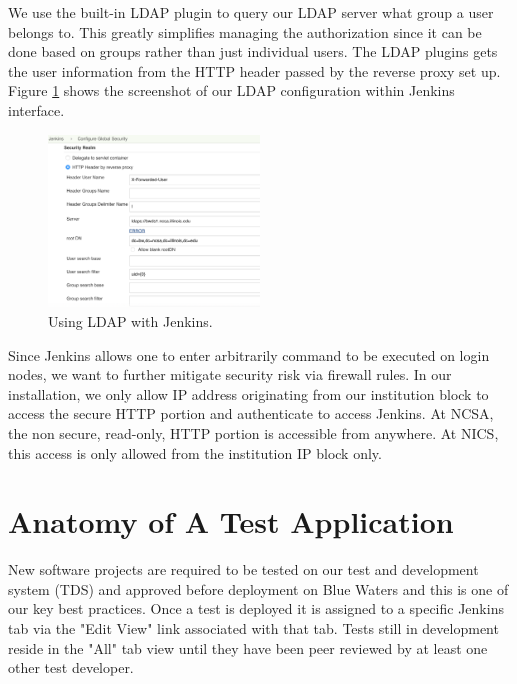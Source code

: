 \documentclass[10pt, conference, compsocconf]{IEEEtran}
\begin{document}
We use the built-in LDAP plugin to query our LDAP server what group a user belongs to.
This greatly simplifies managing the authorization since it can be done based on groups rather than just individual users. 
The LDAP plugins gets the user information from the HTTP header passed by the reverse proxy set up. 
Figure \ref{fig:LDAP-Jenkins} shows the screenshot of our LDAP configuration within Jenkins interface.

\begin{figure}
\centering
\includegraphics[width=0.5\textwidth]{LDAP-Jenkins}
\caption{Using LDAP with Jenkins.}
\label{fig:LDAP-Jenkins}
\end{figure}

Since Jenkins allows one to enter arbitrarily command to be executed on login nodes, we want to further mitigate security risk via firewall rules. 
In our installation, we only allow IP address originating from our institution block to access the secure HTTP portion and authenticate to access Jenkins. 
At NCSA, the non secure, read-only, HTTP portion is accessible from anywhere. 
At NICS, this access is only allowed from the institution IP block only. 


\section{Anatomy of A Test Application}
\label{sec:TestAnatomy}
New software projects are required to be tested on our test and development system (TDS) and approved before deployment on Blue Waters and this is one of our key best practices. 
 Once a test is deployed it is assigned to a specific Jenkins tab via the "Edit View" link associated with that tab. 
 Tests still in development reside in the "All" tab view until they have been peer reviewed by at least one other test developer.
\end{document}

